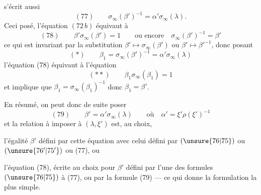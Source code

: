 \deleted{\[(\unsure{77})\qquad\beta'\sigma_\infty(\beta')=1\]}
s'écrit aussi
\[
(77)\qquad\sigma_\infty(\beta')^{-1}=\alpha'\sigma_\infty(\lambda).
\]
Ceci posé, l'équation $(72\,b)$ équivaut à
\[
(78)\qquad\beta'\sigma_\infty(\beta')=1\qquad\text{ou encore}\quad\sigma_\infty(\beta')^{-1}=\beta'
\]
ce qui est invariant par la substitution $\beta'\mapsto\sigma_\infty(\beta')$ ou $\beta'\mapsto\beta'^{-1}$, donc posant
\[
(*)\qquad\beta_1=\sigma_\infty(\beta')^{-1}=\alpha'\sigma_\infty(\lambda)
\]
l'équation (78) équivaut à l'équation
\[
(**)\qquad\beta_1\sigma_\infty(\beta_1)=1
\]
et implique que $\beta_1=\sigma_\infty(\beta_1)^{-1}$ donc $\beta_1=\beta'$.

En résumé, on peut donc de suite poser
\[
(79)\qquad\beta'=\alpha'\sigma_\infty(\lambda)\qquad\text{où}\quad\alpha'=\xi'\rho(\xi')^{-1}
\]
et la relation à imposer à $(\lambda,\xi')$ est, au choix,

l'égalité  $\beta'$ défini par cette équation avec celui défini par  $(\unsure{76|75})$ ou $(\unsure{76'|75'})$ ou (77), ou

l'équation (78), écrite au choix pour $\beta'$ défini par l'une des formules $(\unsure{76|75})$ à (77), ou par la formule (79) --- ce qui donne la formulation la plus simple.

